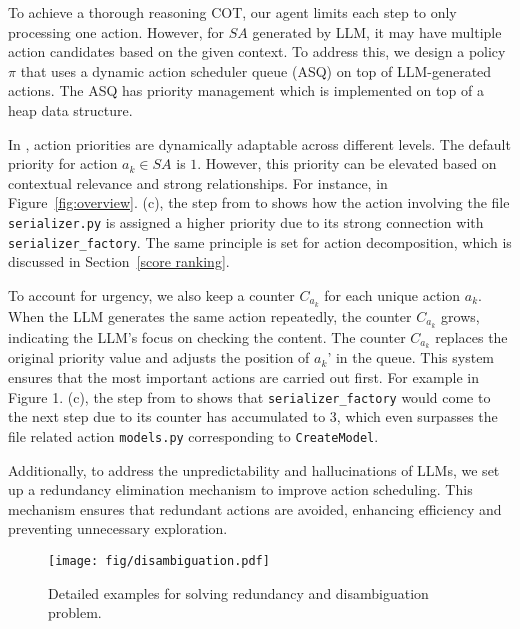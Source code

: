 To achieve a thorough reasoning COT, our agent limits each step to only processing one action. However, for $SA$ generated by LLM, it may have multiple action candidates based on the given context. To address this, we design a policy $\pi$ that uses a dynamic action scheduler queue (ASQ) on top of LLM-generated actions. The ASQ has priority management which is implemented on top of a heap data structure. 

In \nickname, action priorities are dynamically adaptable across different levels. The default priority for action $a_k \in SA$ is $1$. However, this priority can be elevated based on contextual relevance and strong relationships. For instance, in Figure~\ref{fig:overview}. (c), the step from  to  shows how the action involving the file \texttt{serializer.py} is assigned a higher priority due to its strong connection with \texttt{serializer\_factory}. 
The same principle is set for action decomposition, which is discussed in Section~\ref{score ranking}.

To account for urgency, we also keep a counter $C_{a_k}$ for each unique action $a_k$. When the LLM generates the same action repeatedly, the counter $C_{a_k}$ grows, indicating the LLM's focus on checking the content. The counter $C_{a_k}$ replaces the original priority value and adjusts the position of $a_k$' in the queue. This system ensures that the most important actions are carried out first. For example in Figure 1. (c), the step from  to  shows that \texttt{serializer\_factory} would come to the next step due to its counter has accumulated to 3, which even surpasses the file related action \texttt{models.py} corresponding to \texttt{CreateModel}.

Additionally, to address the unpredictability and hallucinations of LLMs, we set up a redundancy elimination mechanism to improve action scheduling. This mechanism ensures that redundant actions are avoided, enhancing efficiency and preventing unnecessary exploration. 

\begin{figure}[t]
    \centering
    \centerline{\texttt{[image: fig/disambiguation.pdf]}}
    \caption{Detailed examples for \nickname solving redundancy and disambiguation problem.}
    \label{fig:dis}
    \vspace{-15pt}
\end{figure}



